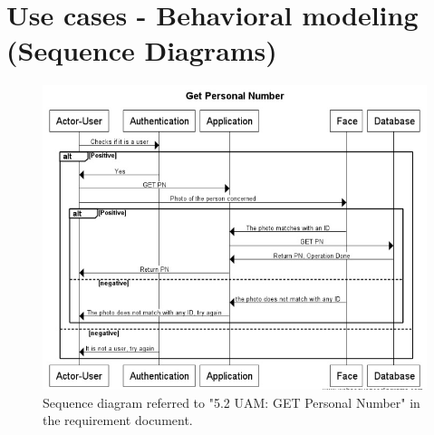 \documentclass[a4paper,11pt]{article}
\begin{document}
\newpage
\section{Use cases - Behavioral modeling (Sequence Diagrams)}

\begin{figure}[ht!]
	\centering
	\includegraphics[width=150mm]{SequenceDiagrams/GetPN.jpg}
	\caption{Sequence diagram referred to "5.2 UAM: GET Personal Number" in the requirement document. \label{1}}
\end{figure}
\end{document}
